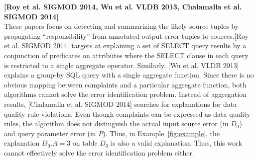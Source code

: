 \documentclass{vldb}
\newcounter{prob}
\begin{document}
\noindent \textbf{[Roy et al. SIGMOD 2014, Wu et al. VLDB 2013, Chalamalla et al. SIGMOD 2014]} \\
These papers focus on detecting and summarizing the likely source tuples by propagating ``responsibility'' from annotated output error tuples to sources.[Roy et al. SIGMOD 2014] targets at explaining a set of SELECT query results by a conjunction of predicates on attributes where the SELECT clause in each query is restricted to a single aggregate operator. 
Similarly, [Wu et al. VLDB 2013] explains a group-by SQL query with a single aggregate function. Since there is no obvious mapping between complaints and a particular aggregate function, both algorithms cannot solve the error identification problem. Instead of aggregation results, [Chalamalla et al. SIGMOD 2014] searches for explanations for data quality rule violations. Even though complaints can be expressed as data quality rules, the algorithm does not distinguish the actual input source error (in $D_0$) and query parameter error (in $P$). Thus, in Example~\ref{fig:example}, the explanation $D_0.A = 3$ on table $D_0$ is also a valid explanation. Thus, this work cannot effectively solve the error identification problem either.
\end{document}
